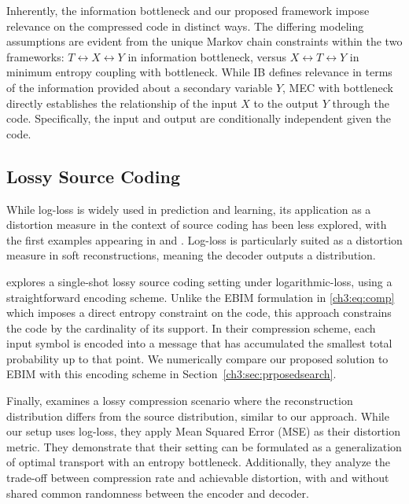 Inherently, the information bottleneck and our proposed framework impose relevance on the compressed code in distinct ways. The differing modeling assumptions are evident from the unique Markov chain constraints within the two frameworks: $T \leftrightarrow X \leftrightarrow Y$ in information bottleneck, versus $X \leftrightarrow T \leftrightarrow Y$ in minimum entropy coupling with bottleneck. While IB defines relevance in terms of the information provided about a secondary variable $Y$, MEC with bottleneck directly establishes the relationship of the input $X$ to the output $Y$ through the code. Specifically, the input and output are conditionally independent given the code.

\subsection{Lossy Source Coding}

While log-loss is widely used in prediction and learning, its application as a distortion measure in the context of source coding has been less explored, with the first examples appearing in \cite{courtade2011multiterminal} and \cite{courtade2013multiterminal}. Log-loss is particularly suited as a distortion measure in soft reconstructions, meaning the decoder outputs a distribution. 

\cite{shkel2017single} explores a single-shot lossy source coding setting under logarithmic-loss, using a straightforward encoding scheme. Unlike the EBIM formulation in \eqref{ch3:eq:comp} which imposes a direct entropy constraint on the code, this approach constrains the code by the cardinality of its support. In their compression scheme, each input symbol is encoded into a message that has accumulated the smallest total probability up to that point. We numerically compare our proposed solution to EBIM with this encoding scheme in Section~\ref{ch3:sec:prposedsearch}. 

Finally, \cite{liu2021lossy} examines a lossy compression scenario where the reconstruction distribution differs from the source distribution, similar to our approach. While our setup uses log-loss, they apply Mean Squared Error (MSE) as their distortion metric. They demonstrate that their setting can be formulated as a generalization of optimal transport with an entropy bottleneck. Additionally, they analyze the trade-off between compression rate and achievable distortion, with and without shared common randomness between the encoder and decoder.

